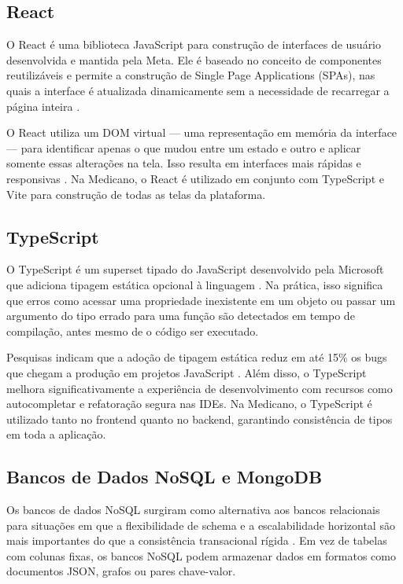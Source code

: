 \subsection{React}
\label{subsec:react}

O React é uma biblioteca JavaScript para construção de
interfaces de usuário desenvolvida e mantida pela Meta.
Ele é baseado no conceito de componentes reutilizáveis
e permite a construção de Single Page Applications
(SPAs), nas quais a interface é atualizada dinamicamente
sem a necessidade de recarregar a página inteira
\cite{reactdev2024}.

O React utiliza um DOM virtual — uma representação em
memória da interface — para identificar apenas o que
mudou entre um estado e outro e aplicar somente essas
alterações na tela. Isso resulta em interfaces mais
rápidas e responsivas \cite{reactdev2024}. Na Medicano,
o React é utilizado em conjunto com TypeScript e Vite
para construção de todas as telas da plataforma.

\subsection{TypeScript}
\label{subsec:typescript}

O TypeScript é um superset tipado do JavaScript
desenvolvido pela Microsoft que adiciona tipagem
estática opcional à linguagem \cite{microsoft2012}.
Na prática, isso significa que erros como acessar uma
propriedade inexistente em um objeto ou passar um
argumento do tipo errado para uma função são detectados
em tempo de compilação, antes mesmo de o código ser
executado.

Pesquisas indicam que a adoção de tipagem estática
reduz em até 15\% os bugs que chegam a produção em
projetos JavaScript \cite{gao2017}. Além disso, o
TypeScript melhora significativamente a experiência
de desenvolvimento com recursos como autocompletar
e refatoração segura nas IDEs. Na Medicano, o TypeScript
é utilizado tanto no frontend quanto no backend,
garantindo consistência de tipos em toda a aplicação.

\subsection{Bancos de Dados NoSQL e MongoDB}
\label{subsec:mongodb}

Os bancos de dados NoSQL surgiram como alternativa aos
bancos relacionais para situações em que a flexibilidade
de schema e a escalabilidade horizontal são mais
importantes do que a consistência transacional rígida
\cite{sadalage2012}. Em vez de tabelas com colunas
fixas, os bancos NoSQL podem armazenar dados em
formatos como documentos JSON, grafos ou pares
chave-valor.

